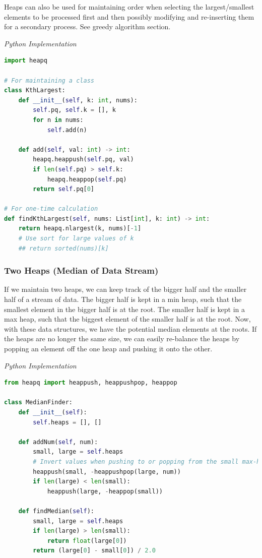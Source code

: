 \documentclass{article}
\begin{document}
    Heaps can also be used for maintaining order when selecting the largest/smallest elements to be processed first and then possibly modifying and re-inserting them for a secondary process. See greedy algorithm section.

\vspace{8pt} \emph{Python Implementation}
\begin{lstlisting}[language=Python]
import heapq

# For maintaining a class 
class KthLargest:
    def __init__(self, k: int, nums):
        self.pq, self.k = [], k
        for n in nums:
            self.add(n)

    def add(self, val: int) -> int:
        heapq.heappush(self.pq, val)
        if len(self.pq) > self.k:
            heapq.heappop(self.pq)
        return self.pq[0]

# For one-time calculation
def findKthLargest(self, nums: List[int], k: int) -> int:
    return heapq.nlargest(k, nums)[-1]
    # Use sort for large values of k
    ## return sorted(nums)[k]
\end{lstlisting}

    \subsubsection{Two Heaps (Median of Data Stream)}
    If we maintain two heaps, we can keep track of the bigger half and the smaller half of a stream of data. The bigger half is kept in a min heap, such that the smallest element in the bigger half is at the root. The smaller half is kept in a max heap, such that the biggest element of the smaller half is at the root. Now, with these data structures, we have the potential median elements at the roots. If the heaps are no longer the same size, we can easily re-balance the heaps by popping an element off the one heap and pushing it onto the other.

\vspace{8pt} \emph{Python Implementation}
\begin{lstlisting}[language=Python]
from heapq import heappush, heappushpop, heappop

class MedianFinder:
    def __init__(self):
        self.heaps = [], []

    def addNum(self, num):
        small, large = self.heaps
        # Invert values when pushing to or popping from the small max-heap. heapq uses a min heap by default.
        heappush(small, -heappushpop(large, num))
        if len(large) < len(small):
            heappush(large, -heappop(small))

    def findMedian(self):
        small, large = self.heaps
        if len(large) > len(small):
            return float(large[0])
        return (large[0] - small[0]) / 2.0
\end{lstlisting}
\end{document}
